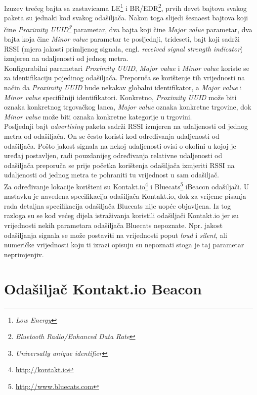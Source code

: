 Izuzev trećeg bajta sa zastavicama LE\footnote{\textit{Low Energy}} i BR/EDR\footnote{\textit{Bluetooth Radio/Enhanced Data Rate}}, prvih devet bajtova svakog paketa su jednaki kod svakog odašiljača. 
Nakon toga slijedi šesnaest bajtova koji čine \textit{Proximity UUID\footnote{\textit{Universally unique identifier}}} parametar, dva bajta koji čine \textit{Major value} parametar, dva bajta koja čine \textit{Minor value} parametar te posljednji, trideseti, bajt koji sadrži RSSI (mjera jakosti primljenog signala, engl. \textit{received signal strength indicator}) izmjeren na udaljenosti od jednog metra.
\\
Konfigurabilni parametari \textit{Proximity UUID}, \textit{Major value} i \textit{Minor value} koriste se za identifikaciju pojedinog odašiljača. 
Preporuča se korištenje tih vrijednosti na način da \textit{Proximity UUID} bude nekakav globalni identifikator, a \textit{Major value} i \textit{Minor value} specifičniji identifikatori. 
Konkretno, \textit{Proximity UUID} može biti oznaka konkretnog trgovačkog lanca, \textit{Major value} oznaka konkretne trgovine, dok \textit{Minor value} može biti oznaka konkretne kategorije u trgovini.
\\
Posljednji bajt \textit{advertising} paketa sadrži RSSI izmjeren na udaljenosti od jednog metra od odašiljača. 
On se često koristi kod određivanja udaljenosti od odašiljača. 
Pošto jakost signala na nekoj udaljenosti ovisi o okolini u kojoj je uređaj postavljen, radi pouzdanijeg određivanja relativne udaljenosti od odašiljača preporuča se prije početka korištenja odašiljača izmjeriti RSSI na udaljenosti od jednog metra te pohraniti tu vrijednost u sam odašiljač.
\\

Za određivanje lokacije korišteni su Kontakt.io\footnote{\url{http://kontakt.io}} i Bluecats\footnote{\url{http://www.bluecats.com}} iBeacon odašiljači. 
U nastavku je navedena specifikacija odašiljača Kontakt.io, dok za vrijeme pisanja rada detaljna specifikacija odašiljača Bluecats nije uopće objavljena. 
Iz tog razloga su se kod većeg dijela istraživanja koristili odašiljači Kontakt.io jer su vrijednosti nekih parametara odašiljača Bluecats nepoznate. 
Npr. jakost odašiljanja signala  se može postaviti na vrijednosti poput \textit{loud} i \textit{silent}, ali numeričke vrijednosti koju ti izrazi opisuju su nepoznati stoga je taj parametar neprimjenjiv.

\section{Odašiljač Kontakt.io Beacon}


